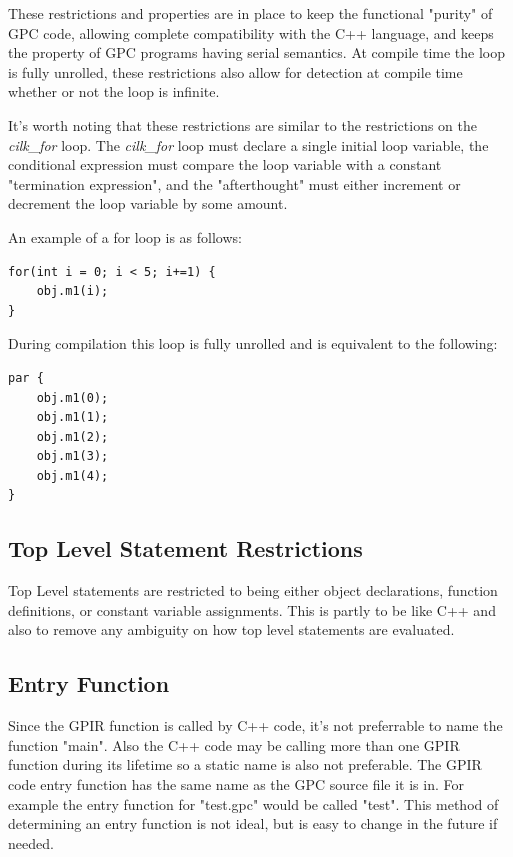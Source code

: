 These restrictions and properties are in place to keep the functional "purity" of GPC code,
allowing complete compatibility with the C++ language, and keeps the property of GPC programs
having serial semantics.  
At compile time the loop is fully unrolled, these restrictions also allow for detection
at compile time whether or not the loop is infinite.  

It's worth noting that these restrictions are similar to the restrictions on the \textit{cilk\_for} loop.
The \textit{cilk\_for} loop must declare a single initial loop variable, the conditional expression must 
compare the loop variable with a constant "termination expression", and the "afterthought" must either increment
or decrement the loop variable by some amount.
\cite{cilkfor}

An example of a for loop is as follows:


\begin{lstlisting}[style=myGPC]
for(int i = 0; i < 5; i+=1) {
    obj.m1(i);
}
\end{lstlisting}


During compilation this loop is fully unrolled and is equivalent
to the following:

\begin{lstlisting}[style=myGPC]
par {
    obj.m1(0);
    obj.m1(1);
    obj.m1(2);
    obj.m1(3);
    obj.m1(4);
}
\end{lstlisting}


\subsection{Top Level Statement Restrictions}
Top Level statements are restricted to being either object declarations, function definitions,
or constant variable assignments. This is partly to be like C++ and also to remove any ambiguity
on how top level statements are evaluated.


\subsection{Entry Function}
Since the GPIR function is called by C++ code, it's not preferrable to name the function "main".
Also the C++ code may be calling more than one GPIR function during its lifetime so a static
name is also not preferable. The GPIR code entry function has the same name as the GPC source
file it is in. For example the entry function  for "test.gpc" would be called "test". This method
of determining an entry function is not ideal, but is easy to change in the future if needed.





